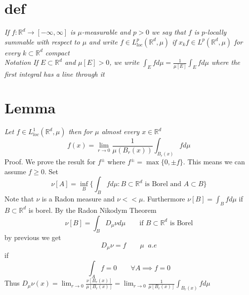 \documentclass[11pt]{article}
\begin{document}
\section{def}
\emph{
    If $f : \mathbb{R}^{d} \rightarrow [-\infty,\infty]$ is $\mu$-measurable and $p > 0$ we say that  $f$ is $p$-locally summable with respect to  $\mu$ and write $f \in L^{p}_{loc}( \mathbb{R}^{d}, \mu)$
    if $x_kf \in L^{p}( \mathbb{R}^{d}, \mu)$ for every $k \subset \mathbb{R}^{d}$ compact
}
\\
\emph{
    Notation If $E \subset \mathbb{R}^{d}$ and $\mu[E] > 0$, we write $\int_{E}^{}f d \mu = \frac{1}{\mu[E]} \int_{E}^{}f d \mu$ where the first integral has a line through it
}
\section{Lemma}
\emph{
    Let $f \in L_{loc}^{1}( \mathbb{R}^{d}, \mu)$ then for $\mu$ almost every $x \in \mathbb{R}^{d}$ 
    \[
    f(x) = \lim_{r\to 0} \frac{1}{\mu(B_r(x))}\int_{B_r(x)}^{}f d\mu
    \] 
}
Proof. We prove the result for $f^{\pm}$ where $f^{\pm} = \max\{0,\pm f\}$. This means we can assume $f \ge 0$. Set
 \[
     \nu[A] = \inf_B \{\int_{B}^{}f d \mu : B \subset \mathbb{R}^{d} \text{ is Borel and } A \subset B\}
\] 
Note that $\nu$ is a Radon measure and $\nu << \mu$. Furthermore $\nu[B] = \int_{B}^{}f d \mu$ if $B \subset \mathbb{R}^{d}$ is borel.
By the Radon Nikodym Theorem
\[
    \nu[B] = \int_{B}^{}D_\mu \nu d \mu \qquad \text{if $B \subset \mathbb{R}^{d}$ is Borel}
\] 
by previous we get
\[
D_\mu \nu = f \qquad \mu \;\; a.e
\] 
if
\[
\int_{A}^{}f = 0 \qquad \forall A \implies f = 0
\] 
Thus $D_\mu \nu(x) = \lim_{r\to 0} \frac{\nu[B_r(x)]}{\mu[B_r(x)]} = \lim_{r\to 0} \frac{1}{\mu[B_r(x)]} \int_{B_r(x)}^{}f d \mu$
\end{document}
